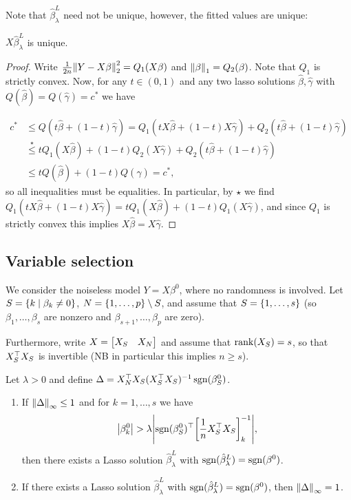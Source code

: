 Note that $\hat\beta^L_\lambda$ need not be unique, however, the fitted values are unique:
\begin{proposition}
	$X\hat\beta_\lambda^L$ is unique. 
\end{proposition}

\begin{proof}
	Write $\frac1{2n}\norm{Y- X\beta}_2^2 = Q_1(X \beta)$ and $\norm{\beta}_1 = Q_2(\beta)$. Note that $Q_1$ is strictly convex. Now, for any $t\in (0, 1)$ and any two lasso solutions $\hat\beta, \hat\gamma$ with $Q(\hat\beta) = Q(\hat\gamma) = c^*$ we have
	
	\begin{align*}
		c^* &\leq Q(t\hat\beta + (1-t)\hat\gamma) = Q_1(tX\hat\beta+(1-t)X\hat\gamma) + Q_2(t\hat\beta + (1-t)\hat\gamma) \\
		&\overset\star\leq t Q_1(X\hat\beta) + (1-t)Q_2(X\hat\gamma) + Q_2(t\hat\beta + (1-t)\hat\gamma) \\
		&\leq t Q(\hat\beta) + (1-t)Q(\hat\gamma) = c^*,
	\end{align*}
so all inequalities must be equalities. In particular, by $\star$ we find $Q_1(tX\hat\beta + (1-t)X\hat\gamma) = t Q_1(X\hat\beta) + (1-t)Q_1(X\hat\gamma)$, and since $Q_1$ is strictly convex this implies $X\hat\beta = X\hat\gamma$. 
\end{proof}

\subsection{Variable selection}
We consider the noiseless model $Y = X\beta^0$, where no randomness is involved. Let $S = \qty{k \mid \beta_k \neq 0}$, $N = \qty{1, \dotsc, p} \setminus S$, and assume that $S = \qty{1, \dotsc, s}$ (so $\beta_1, \dotsc, \beta_s$ are nonzero and $\beta_{s+1}, \dotsc, \beta_p$ are zero). 

Furthermore, write $X = \mqty[ X_S & X_N]$ and assume that $\rank(X_S) = s$, so that $X_S^\top X_S$ is invertible (NB in particular this implies $n \geq s$). 
\begin{theorem}
Let $\lambda > 0$ and define $\Delta = X_N^\top X_S(X_S^\top X_S)^{-1} \operatorname{sgn}(\beta^0_S)$. 
\begin{enumerate}
	\item If $\norm{\Delta}_{\infty} \leq 1$ and for $k = 1, \dotsc, s$ we have
	\[
	\abs{\beta^0_k} > \lambda \abs{\operatorname{sgn}(\beta^0_S)^\top \qty[\frac1n X_S^\top X_S]^{-1}_k},
	\]
	then there exists a Lasso solution $\hat\beta_\lambda^L$ with $\operatorname{sgn}(\hat\beta_\lambda^L) = \operatorname{sgn}(\beta^0)$. 
	
	\item If there exists a Lasso solution $\hat\beta_\lambda^L$ with $\operatorname{sgn}(\hat\beta_\lambda^L) = \operatorname{sgn}(\beta^0)$, then $\norm{\Delta}_{\infty} = 1$. 
\end{enumerate}
\end{theorem}

